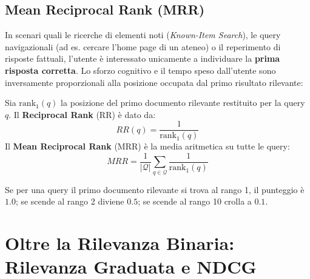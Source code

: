 \subsection{Mean Reciprocal Rank (MRR)}
In scenari quali le ricerche di elementi noti (\textit{Known-Item Search}), le query navigazionali (ad es. cercare l'home page di un ateneo) o il reperimento di risposte fattuali, l'utente è interessato unicamente a individuare la \textbf{prima risposta corretta}. Lo sforzo cognitivo e il tempo speso dall'utente sono inversamente proporzionali alla posizione occupata dal primo risultato rilevante:

\begin{definition}
Sia $\mathrm{rank}_1(q)$ la posizione del primo documento rilevante restituito per la query $q$. Il \textbf{Reciprocal Rank} (RR) è dato da:
\begin{equation}
RR(q) = \frac{1}{\mathrm{rank}_1(q)}
\end{equation}
Il \textbf{Mean Reciprocal Rank} (MRR) è la media aritmetica su tutte le query:
\begin{equation}
MRR = \frac{1}{|\mathcal{Q}|} \sum_{q \in \mathcal{Q}} \frac{1}{\mathrm{rank}_1(q)}
\end{equation}
\end{definition}
Se per una query il primo documento rilevante si trova al rango 1, il punteggio è $1.0$; se scende al rango 2 diviene $0.5$; se scende al rango 10 crolla a $0.1$.

\FloatBarrier
\section{Oltre la Rilevanza Binaria: Rilevanza Graduata e NDCG}

